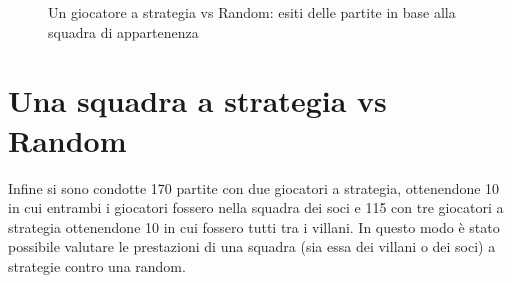\begin{figure}[t]




\caption {Un giocatore a strategia vs Random: esiti delle partite in base alla squadra di appartenenza} \label{pietab:esperimento-strat-random} 
\end{figure}






\section{Una squadra a strategia vs Random}

Infine si sono condotte 170 partite con due giocatori a strategia, ottenendone 10 in cui entrambi i giocatori fossero nella squadra dei soci e 115 con tre giocatori a strategia ottenendone 10 in cui fossero tutti tra i villani.
In questo modo è stato possibile valutare le prestazioni di una squadra (sia essa dei villani o dei soci) a strategie contro una random.


